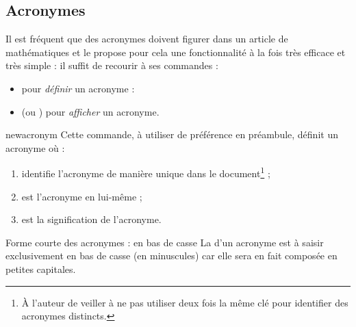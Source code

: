 \documentclass[french,nolocaltoc]{nwejmart}
\newtheorem[style=definition]{fait}
\newtheorem[title=contraventionnalisation]{ctrv}
\newtheorem[title-plural=anneaux]{anneau}
\newtheorem[title-plural=idéaux]{idéal}
\begin{document}
%

\subsection{Acronymes}
\label{sec:acronymes}

Il est fréquent que des acronymes doivent figurer dans un article de
mathématiques et le  propose pour cela une fonctionnalité
à la fois très efficace et très simple : il suffit de recourir à ses commandes :
\begin{itemize}
\item {} pour \emph{définir} un acronyme :
\item {} (ou ) pour \emph{afficher} un acronyme.
\end{itemize}

\begin{docCommand}{newacronym}{}
  Cette commande, à utiliser de préférence en préambule, définit un acronyme
  où :
  \begin{enumerate}
  \item {} identifie l'acronyme de manière unique dans le
    document\footnote{À l'auteur de veiller à ne pas utiliser deux fois la même
      clé pour identifier des acronymes distincts.} ;
  \item {} est l'acronyme en lui-même ;
  \item {} est la signification de l'acronyme.
  \end{enumerate}
\begin{dbwarning}{Forme courte des acronymes : en bas de casse}{}
  La  d'un acronyme est à saisir exclusivement en bas de
  casse (en minuscules) car elle sera en fait composée en petites capitales.
\end{dbwarning}
\end{docCommand}
\end{document}
